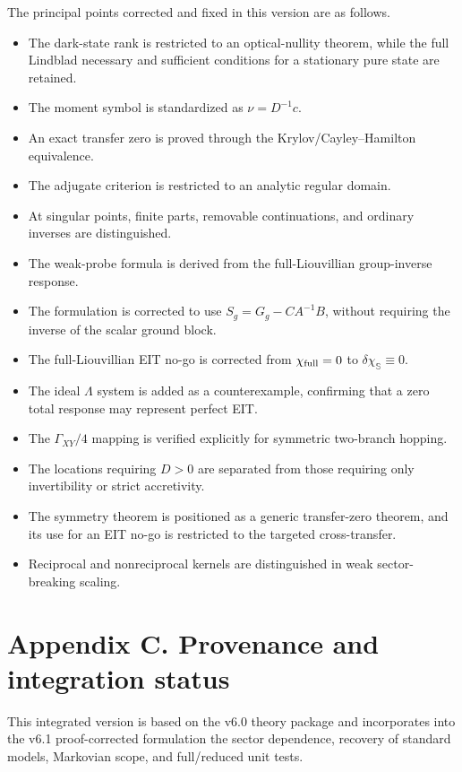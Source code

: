 \documentclass[
  10pt,
  a4paper,
]{article}
\providecommand{\tightlist}{%
  \setlength{\itemsep}{0pt}\setlength{\parskip}{0pt}}
\begin{document}
The principal points corrected and fixed in this version are as follows.

\begin{itemize}
\tightlist
\item
  The dark-state rank is restricted to an optical-nullity theorem, while
  the full Lindblad necessary and sufficient conditions for a stationary
  pure state are retained.
\item
  The moment symbol is standardized as \(\nu=D^{-1}c\).
\item
  An exact transfer zero is proved through the Krylov/Cayley--Hamilton
  equivalence.
\item
  The adjugate criterion is restricted to an analytic regular domain.
\item
  At singular points, finite parts, removable continuations, and
  ordinary inverses are distinguished.
\item
  The weak-probe formula is derived from the full-Liouvillian
  group-inverse response.
\item
  The formulation is corrected to use \(S_g=G_g-CA^{-1}B\), without
  requiring the inverse of the scalar ground block.
\item
  The full-Liouvillian EIT no-go is corrected from \(\chi_{\rm full}=0\)
  to \(\delta\chi_{\mathbb S}\equiv0\).
\item
  The ideal \(\Lambda\) system is added as a counterexample, confirming
  that a zero total response may represent perfect EIT.
\item
  The \(\Gamma_{XY}/4\) mapping is verified explicitly for symmetric
  two-branch hopping.
\item
  The locations requiring \(D>0\) are separated from those requiring
  only invertibility or strict accretivity.
\item
  The symmetry theorem is positioned as a generic transfer-zero theorem,
  and its use for an EIT no-go is restricted to the targeted
  cross-transfer.
\item
  Reciprocal and nonreciprocal kernels are distinguished in weak
  sector-breaking scaling.
\end{itemize}

\section{Appendix C. Provenance and integration
status}\label{appendix-c.-provenance-and-integration-status}

This integrated version is based on the v6.0 theory package and
incorporates into the v6.1 proof-corrected formulation the sector
dependence, recovery of standard models, Markovian scope, and
full/reduced unit tests.
\end{document}
